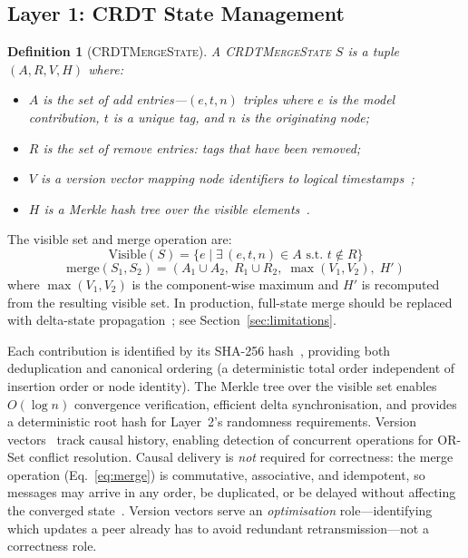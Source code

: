 \documentclass[10pt,letterpaper]{article}
\newcommand{\CMS}{\texorpdfstring{{\mdseries\upshape\textsc{CRDTMergeState}}}{CRDTMergeState}}
\newtheorem{definition}[theorem]{Definition}
\begin{document}
\subsection{Layer 1: CRDT State Management}

\begin{definition}[\CMS{}]\label{def:state}
A \CMS{} $S$ is a tuple $(A, R, V, H)$ where:
\begin{itemize}[leftmargin=*]
\item $A$ is the set of add entries---$(e,t,n)$ triples where $e$ is the model contribution, $t$ is a unique tag, and $n$ is the originating node;
\item $R$ is the set of remove entries: tags that have been removed;
\item $V$ is a version vector mapping node identifiers to logical timestamps~\cite{lamport1978time};
\item $H$ is a Merkle hash tree over the visible elements~\cite{sanjuan2020merkle}.
\end{itemize}
\end{definition}

The visible set and merge operation are:
\begin{equation}\label{eq:visible}
\mathrm{Visible}(S) = \{e \mid \exists\, (e,t,n) \in A \text{ s.t.\ } t \notin R\}
\end{equation}
\begin{equation}\label{eq:merge}
\mathrm{merge}(S_1, S_2) = (A_1 \cup A_2,\; R_1 \cup R_2,\; \max(V_1, V_2),\; H')
\end{equation}
where $\max(V_1,V_2)$ is the component-wise maximum and $H'$ is recomputed from the resulting visible set.
In production, full-state merge should be replaced with delta-state propagation~\cite{almeida2018delta}; see Section~\ref{sec:limitations}.

Each contribution is identified by its SHA-256 hash~\cite{sanjuan2020merkle}, providing both deduplication and canonical ordering (a deterministic total order independent of insertion order or node identity).
The Merkle tree over the visible set enables $O(\log n)$ convergence verification, efficient delta synchronisation, and provides a deterministic root hash for Layer~2's randomness requirements.
Version vectors~\cite{lamport1978time} track causal history, enabling detection of concurrent operations for OR-Set conflict resolution.
Causal delivery is \emph{not} required for correctness: the merge operation (Eq.~\ref{eq:merge}) is commutative, associative, and idempotent, so messages may arrive in any order, be duplicated, or be delayed without affecting the converged state~\cite{shapiro2011conflict}.
Version vectors serve an \emph{optimisation} role---identifying which updates a peer already has to avoid redundant retransmission---not a correctness role.
\end{document}

